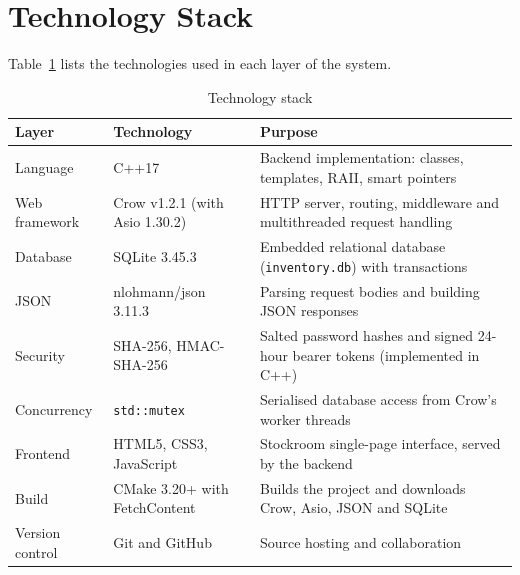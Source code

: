 \documentclass[12pt,a4paper,oneside]{book}
\begin{document}
\section{Technology Stack}
Table~\ref{tab:stack} lists the technologies used in each layer of the system.

\begin{table}[H]
\centering
\caption{Technology stack}
\label{tab:stack}
\small
\begin{tabular}{@{}l l >{\raggedright\arraybackslash}p{6.4cm}@{}}
\toprule
\textbf{Layer} & \textbf{Technology} & \textbf{Purpose} \\
\midrule
Language     & C++17                         & Backend implementation: classes, templates, RAII, smart pointers \\
Web framework& Crow v1.2.1 (with Asio 1.30.2) & HTTP server, routing, middleware and multithreaded request handling \\
Database     & SQLite 3.45.3                 & Embedded relational database (\texttt{inventory.db}) with transactions \\
JSON         & nlohmann/json 3.11.3          & Parsing request bodies and building JSON responses \\
Security     & SHA-256, HMAC-SHA-256         & Salted password hashes and signed 24-hour bearer tokens (implemented in C++) \\
Concurrency  & \texttt{std::mutex} & Serialised database access from Crow's worker threads \\
Frontend     & HTML5, CSS3, JavaScript       & Stockroom single-page interface, served by the backend \\
Build        & CMake 3.20+ with FetchContent & Builds the project and downloads Crow, Asio, JSON and SQLite \\
Version control & Git and GitHub             & Source hosting and collaboration \\
\bottomrule
\end{tabular}
\end{table}
\end{document}
